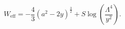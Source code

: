 \begin{equation}
        W_{\mathrm{eff}} = -\frac{4}{3} (a^2 - 2 y)^{\frac{3}{2}} + S \log \left (\frac{\Lambda^4}{y^2} \right ).
\end{equation}

